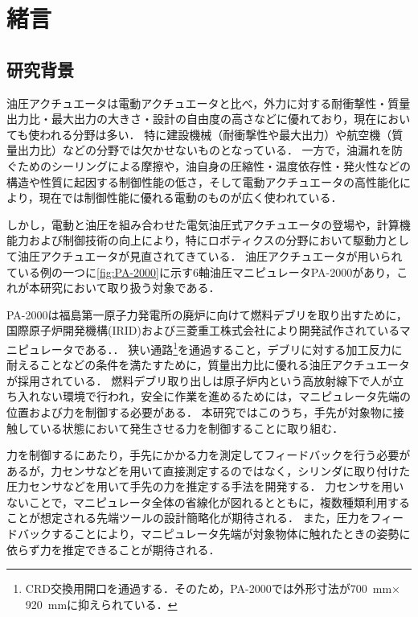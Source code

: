 \chapter{緒言}

\section{研究背景}
油圧アクチュエータは電動アクチュエータと比べ，外力に対する耐衝撃性・質量出力比・最大出力の大きさ・設計の自由度の高さなどに優れており，現在においても使われる分野は多い．
特に建設機械（耐衝撃性や最大出力）や航空機（質量出力比）などの分野では欠かせないものとなっている．
一方で，油漏れを防ぐためのシーリングによる摩擦や，油自身の圧縮性・温度依存性・発火性などの構造や性質に起因する制御性能の低さ，そして電動アクチュエータの高性能化により，現在では制御性能に優れる電動のものが広く使われている．

しかし，電動と油圧を組み合わせた電気油圧式アクチュエータの登場や，計算機能力および制御技術の向上により，特にロボティクスの分野において駆動力として油圧アクチュエータが見直されてきている．
油圧アクチュエータが用いられている例の一つに\figname\ref{fig:PA-2000}に示す6軸油圧マニピュレータPA-2000\cite{IRID}があり，これが本研究において取り扱う対象である．

PA-2000は福島第一原子力発電所の廃炉に向けて燃料デブリを取り出すために，国際原子炉開発機構(IRID)および三菱重工株式会社により開発試作されているマニピュレータである．\cite{河西賢一2018福島第一原子力発電所燃料デブリ横取り出しに向けたロボット開発}．
狭い通路\footnote{CRD交換用開口を通過する．そのため，PA-2000では外形寸法が\SI{700}{mm}$\times$\SI{920}{mm}に抑えられている．}を通過すること，デブリに対する加工反力に耐えることなどの条件を満たすために，質量出力比に優れる油圧アクチュエータが採用されている．
燃料デブリ取り出しは原子炉内という高放射線下で人が立ち入れない環境で行われ，安全に作業を進めるためには，マニピュレータ先端の位置および力を制御する必要がある．
本研究ではこのうち，手先が対象物に接触している状態において発生させる力を制御することに取り組む．

力を制御するにあたり，手先にかかる力を測定してフィードバックを行う必要があるが，力センサなどを用いて直接測定するのではなく，シリンダに取り付けた圧力センサなどを用いて手先の力を推定する手法を開発する．
力センサを用いないことで，マニピュレータ全体の省線化が図れるとともに，複数種類利用することが想定される先端ツールの設計簡略化が期待される．
また，圧力をフィードバックすることにより，マニピュレータ先端が対象物体に触れたときの姿勢に依らず力を推定できることが期待される．

